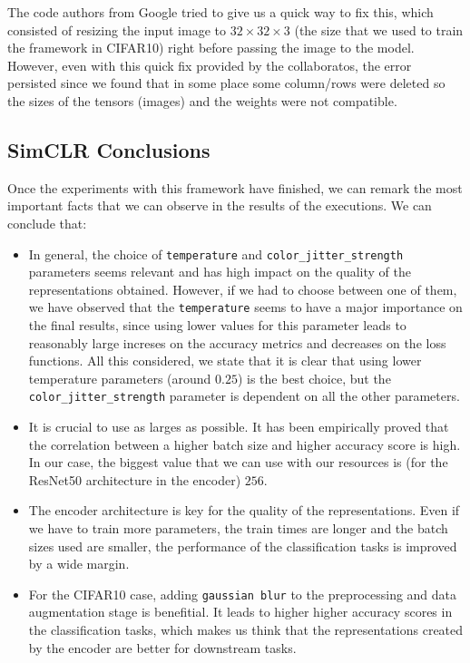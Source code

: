 The code authors from Google tried to give us a quick way to fix this, which consisted of resizing the input image to $32\times 32 \times 3$ (the size that we used to train the framework in CIFAR10) right before passing the image to the model. However, even with this quick fix provided by the collaboratos, the error persisted since we found that in some place some column/rows were deleted so the sizes of the tensors (images) and the weights were not compatible.


\subsection{SimCLR Conclusions}

Once the experiments with this framework have finished, we can remark the most important facts that we can observe in the results of the executions. We can conclude that:
\begin{itemize}
\item In general, the choice of \lstinline{temperature} and \lstinline{color_jitter_strength} parameters seems relevant and has high impact on the quality of the representations obtained. However, if we had to choose between one of them, we have observed that the \lstinline{temperature}  seems to have a major importance on the final results, since using lower values for this parameter leads to reasonably large increses on the accuracy metrics and decreases on the loss functions. All this considered, we  state that it is clear that using lower temperature parameters (around $0.25$) is the best choice, but the \lstinline{color_jitter_strength} parameter is dependent on all the other parameters.

\item It is crucial to use  as larges as possible. It has been empirically proved that the correlation between a higher batch size and higher accuracy score is high. In our case, the biggest value that we can use with our resources is (for the ResNet50 architecture in the encoder) $256$.

\item The encoder architecture is key for the quality of the representations. Even if we have to train more parameters,  the train times are longer and the batch sizes used are smaller, the performance of the classification tasks is improved by a wide margin.

\item For the CIFAR10 case, adding \lstinline{gaussian blur} to the preprocessing and data augmentation stage is benefitial. It leads to higher higher accuracy scores in the classification tasks, which makes us think that the representations created by the encoder are better for downstream tasks.
\end{itemize}

